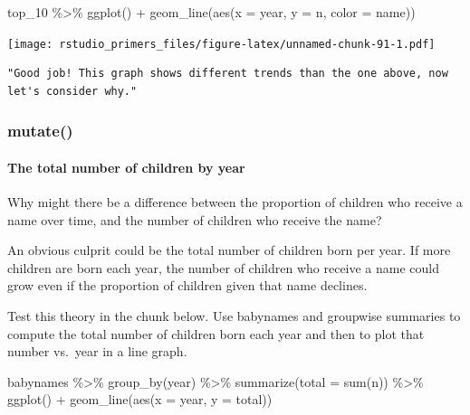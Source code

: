 \documentclass[
]{article}
\newenvironment{Shaded}{\begin{snugshade}}{\end{snugshade}}
\newcommand{\AttributeTok}[1]{\textcolor[rgb]{0.77,0.63,0.00}{#1}}
\newcommand{\FunctionTok}[1]{\textcolor[rgb]{0.00,0.00,0.00}{#1}}
\newcommand{\NormalTok}[1]{#1}
\newcommand{\SpecialCharTok}[1]{\textcolor[rgb]{0.00,0.00,0.00}{#1}}
\begin{document}
\begin{Shaded}
\begin{Highlighting}[]
\NormalTok{top\_10 }\SpecialCharTok{\%\textgreater{}\%}
  \FunctionTok{ggplot}\NormalTok{() }\SpecialCharTok{+}
    \FunctionTok{geom\_line}\NormalTok{(}\FunctionTok{aes}\NormalTok{(}\AttributeTok{x =}\NormalTok{ year, }\AttributeTok{y =}\NormalTok{ n, }\AttributeTok{color =}\NormalTok{ name))}
\end{Highlighting}
\end{Shaded}

\texttt{[image: rstudio\_primers\_files/figure-latex/unnamed-chunk-91-1.pdf]}

\begin{verbatim}
"Good job! This graph shows different trends than the one above, now let's consider why."
\end{verbatim}

\hypertarget{mutate}{%
\subsubsection{mutate()}\label{mutate}}

\hypertarget{the-total-number-of-children-by-year}{%
\paragraph{The total number of children by
year}\label{the-total-number-of-children-by-year}}

Why might there be a difference between the proportion of children who
receive a name over time, and the number of children who receive the
name?

An obvious culprit could be the total number of children born per year.
If more children are born each year, the number of children who receive
a name could grow even if the proportion of children given that name
declines.

Test this theory in the chunk below. Use babynames and groupwise
summaries to compute the total number of children born each year and
then to plot that number vs.~year in a line graph.

\begin{Shaded}
\begin{Highlighting}[]
\NormalTok{babynames }\SpecialCharTok{\%\textgreater{}\%} 
   \FunctionTok{group\_by}\NormalTok{(year) }\SpecialCharTok{\%\textgreater{}\%}
   \FunctionTok{summarize}\NormalTok{(}\AttributeTok{total =} \FunctionTok{sum}\NormalTok{(n)) }\SpecialCharTok{\%\textgreater{}\%}
   \FunctionTok{ggplot}\NormalTok{() }\SpecialCharTok{+}
      \FunctionTok{geom\_line}\NormalTok{(}\FunctionTok{aes}\NormalTok{(}\AttributeTok{x =}\NormalTok{ year, }\AttributeTok{y =}\NormalTok{ total))}
\end{Highlighting}
\end{Shaded}
\end{document}
